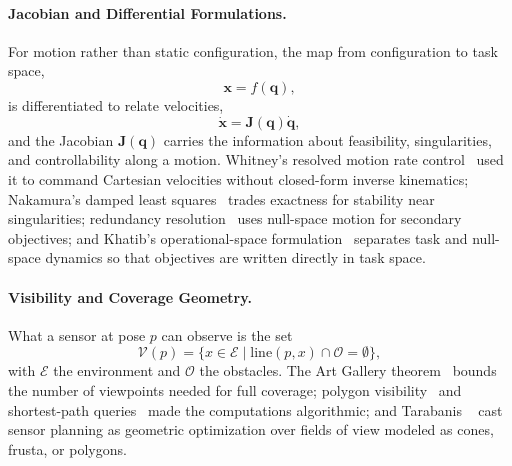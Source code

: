 \paragraph{Jacobian and Differential Formulations.}
For motion rather than static configuration, the map from configuration to task space,
\begin{equation}
\mathbf{x} = f(\mathbf{q}),
\end{equation}
is differentiated to relate velocities,
\begin{equation}
\dot{\mathbf{x}} = \mathbf{J}(\mathbf{q}) \dot{\mathbf{q}},
\end{equation}
and the Jacobian $\mathbf{J}(\mathbf{q})$ carries the information about feasibility, singularities, and controllability along a motion. Whitney's resolved motion rate control~\cite{Whitney1969ResolvedMotion} used it to command Cartesian velocities without closed-form inverse kinematics; Nakamura's damped least squares~\cite{Nakamura1986IKSingularity} trades exactness for stability near singularities; redundancy resolution~\cite{Liegeois1977Redundancy,Siciliano1991Redundancy} uses null-space motion for secondary objectives; and Khatib's operational-space formulation~\cite{Khatib1987OperationalSpace} separates task and null-space dynamics so that objectives are written directly in task space.

\paragraph{Visibility and Coverage Geometry.}
What a sensor at pose $p$ can observe is the set
\begin{equation}
\mathcal{V}(p) = \{ x \in \mathcal{E} \mid \text{line}(p,x) \cap \mathcal{O}
= \emptyset \},
\end{equation}
with $\mathcal{E}$ the environment and $\mathcal{O}$ the obstacles. The Art Gallery theorem~\cite{Chvatal1975ArtGallery,ORourke1987ArtGallery} bounds the number of viewpoints needed for full coverage; polygon visibility~\cite{Lee1983Visibility} and shortest-path queries~\cite{Guibas1987ShortestPath} made the computations algorithmic; and Tarabanis \etal~\cite{Tarabanis1995SensorPlanning} cast sensor planning as geometric optimization over fields of view modeled as cones, frusta, or polygons.

